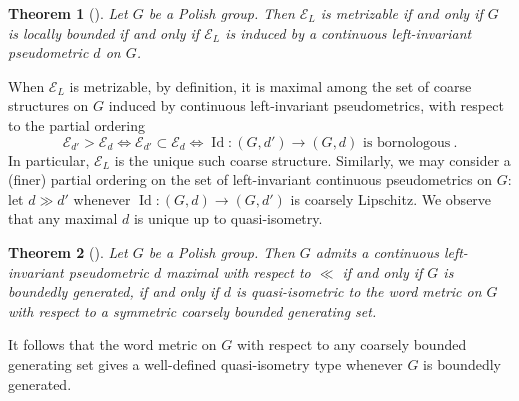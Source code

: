 \documentclass[twoside]{amsart}
\theoremstyle{plain}
\newtheorem{theorem}{Theorem}[section]
\theoremstyle{break}
\theoremstyle{definition}
\theoremstyle{remark}
\DeclareMathOperator{\Id}{Id}
\newcommand{\mk}[1]{\textcolor{teal}{#1 \textbf{[mk]}}}
\begin{document}
\begin{theorem}[{\cite[Thm.~2.38]{rosendal}}]
Let $G$ be a Polish group.  Then $\mathcal{E}_L$ is metrizable if
and only if $G$ is locally bounded if and only if $\mathcal{E}_L$ is induced by a continuous left-invariant pseudometric $d$ on $G$.    
\end{theorem}

  When $\mathcal{E}_L$ is metrizable, by definition, it is maximal among the set of
coarse structures on $G$ induced by continuous left-invariant
pseudometrics, with
respect to the partial ordering 
\[\mathcal{E}_{d'} >
\mathcal{E}_{d} \iff \mathcal{E}_{d'} \subset \mathcal{E}_d \iff
\Id : (G,d') \to (G,d) \text{ is bornologous}\:.\]  
In particular, $\mathcal{E}_L$ is the unique 
such coarse structure.
Similarly, we may consider a (finer) partial ordering on the set of 
left-invariant
continuous pseudometrics on $G$: let $d \gg d'$ whenever $\Id :
(G,d) \to (G,d')$ is coarsely Lipschitz.  We observe that any 
maximal $d$ is unique up to quasi-isometry.

\begin{theorem}[{\cite[Prop.~2.72]{rosendal}}]\label{thm:max_gen}
 Let $G$ be a Polish group.  Then $G$ admits a continuous
 left-invariant pseudometric $d$ maximal
 with respect to $\ll$ if and only if $G$ is boundedly
 generated, if and only if $d$ is quasi-isometric to the word metric
 on $G$ with respect to a symmetric coarsely bounded generating set.
\end{theorem}

\noindent
It follows that the word metric on $G$ with respect to any coarsely bounded
generating set gives a well-defined quasi-isometry type whenever $G$
is boundedly generated. 

\end{document}
